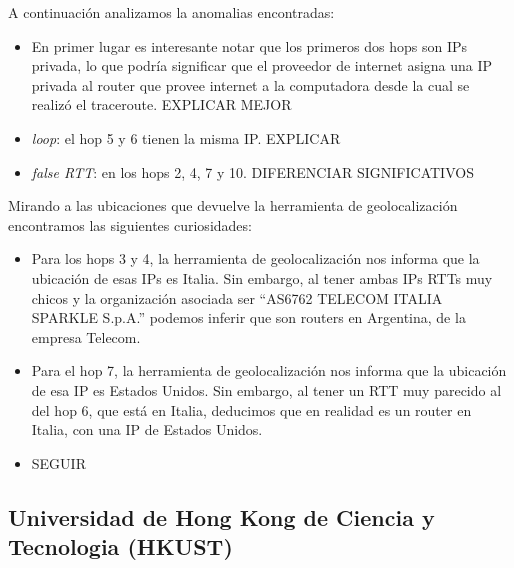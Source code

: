 A continuación analizamos la anomalias encontradas:

\begin{itemize}
  \item En primer lugar es interesante notar que los primeros dos hops son IPs privada, lo que podría significar que el proveedor de internet asigna una IP privada al router que provee internet a la computadora desde la cual se realizó el traceroute. EXPLICAR MEJOR
  \item \textit{loop}: el hop 5 y 6 tienen la misma IP. EXPLICAR
  \item \textit{false RTT}: en los hops 2, 4, 7 y 10. DIFERENCIAR SIGNIFICATIVOS
\end{itemize}

Mirando a las ubicaciones que devuelve la herramienta de geolocalización encontramos las siguientes curiosidades:

\begin{itemize}
  \item Para los hops 3 y 4, la herramienta de geolocalización nos informa que la ubicación de esas IPs es Italia. Sin embargo, al tener ambas IPs RTTs muy chicos y la organización asociada ser ``AS6762 TELECOM ITALIA SPARKLE S.p.A.'' podemos inferir que son routers en Argentina, de la empresa Telecom.
  \item Para el hop 7,  la herramienta de geolocalización nos informa que la ubicación de esa IP es Estados Unidos. Sin embargo, al tener un RTT muy parecido al del hop 6, que está en Italia, deducimos que en realidad es un router en Italia, con una IP de Estados Unidos.
  \item SEGUIR
\end{itemize}

\begin{figure}[H]
    \centering
\end{figure}


\subsection{Universidad de Hong Kong de Ciencia y Tecnologia (HKUST)}

